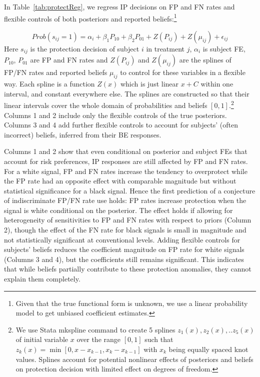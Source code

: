 \documentclass[12pt,a4paper]{article}
\begin{document}






In Table~\ref{tab:protectReg}, we regress IP decisions on FP and FN rates and flexible controls of both posteriors and reported beliefs:\footnote{Given that the true functional form is unknown, we use a linear probability model to get unbiased coefficient estimates.}

	\[Prob(s_{ij}=1)=\alpha_i+\beta_1 P_{10}+\beta_2 P_{01} +Z(P_{ij})+Z(\mu_{ij})+\epsilon_{ij} \]
Here $s_{ij}$ is the protection decision of subject $i$ in treatment $j$, $\alpha_i$ is subject FE, $P_{10}$, $P_{01}$ are FP and FN rates and $Z(P_{ij})$ and $Z(\mu_{ij})$ are the splines of FP/FN rates  and reported beliefs $\mu_{ij}$ to control for these variables in a flexible way. Each spline is a function $Z(x)$ which is just linear $x+C$ within one interval, and constant everywhere else. The splines are constructed so that their linear intervals cover the whole domain of probabilities and beliefs $[0,1]$.\footnote{We use Stata mkspline command to create 5 splines $z_1(x),z_2(x),..z_5(x)$ of initial variable $x$ over the range $[0,1]$ such that $z_k(x)=\min[0,x-x_{k-1},x_k-x_{k-1}]$ with $x_k$ being equally spaced knot values. Splines account for potential nonlinear effects of posteriors and beliefs on protection decision with limited effect on degrees of freedom.} Columns 1 and 2 include only the flexible controls of the true posteriors. Columns 3 and 4 add further flexible controls to account for subjects' (often incorrect) beliefs, inferred from their BE responses.

Columns 1 and 2 show that even conditional on posterior and subject FEs that account for risk preferences, IP responses are still affected by FP and FN rates. For a white signal, FP and FN rates increase the tendency to overprotect while the FP rate had an opposite effect with comparable magnitude but without statistical significance for a black signal. Hence the first prediction of a conjecture of indiscriminate FP/FN rate use holds: FP rates increase protection when the signal is white conditional on the posterior. The effect holds if allowing for heterogeneity of sensitivities to FP and FN rates with respect to priors (Column 2), though the effect of the FN rate for black signals is small in magnitude and not statistically significant at conventional levels. Adding flexible controls for subjects' beliefs reduces the coefficient magnitude on FP rate for white signals (Columns 3 and 4), but the coefficients still remains significant. This indicates that while beliefs partially contribute to these protection anomalies, they cannot explain them completely.
\end{document}
